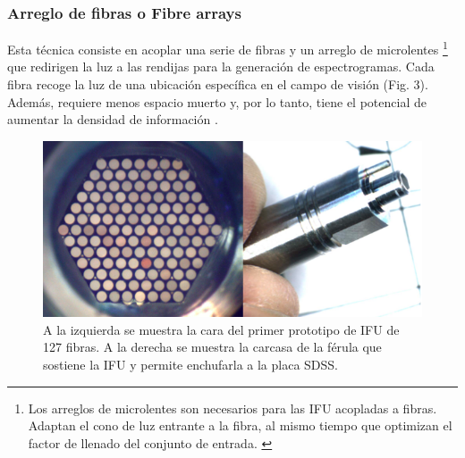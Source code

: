 \documentclass[9pt,twocolumn,a4paper]{opticajnl}
\begin{document}
\subsubsection*{Arreglo de fibras o Fibre arrays} 
Esta técnica consiste en acoplar una serie de fibras y un arreglo de microlentes \footnote{Los arreglos de microlentes son necesarios para las IFU acopladas a fibras. Adaptan el cono de luz entrante a la fibra, al mismo tiempo que optimizan el factor de llenado del conjunto de entrada. \cite{schmoll2006design}} que redirigen la luz a las rendijas para la generación de espectrogramas. Cada fibra recoge la luz de una ubicación específica en el campo de visión (Fig. 3). Además, requiere menos espacio muerto y, por lo tanto, tiene el potencial de aumentar la densidad de información \cite{allington2006basic}.
\begin{figure}
    \centering
    \includegraphics[width=0.8\linewidth]{fibrefeed.png}
    \caption{A la izquierda se muestra la cara del primer prototipo de IFU de 127 fibras. A la derecha se muestra la carcasa de la férula que sostiene la IFU y permite enchufarla a la placa SDSS. \cite{sdss_bundle_ferrule}}
    \label{fig:fibrefeed}
\end{figure}
\end{document}
